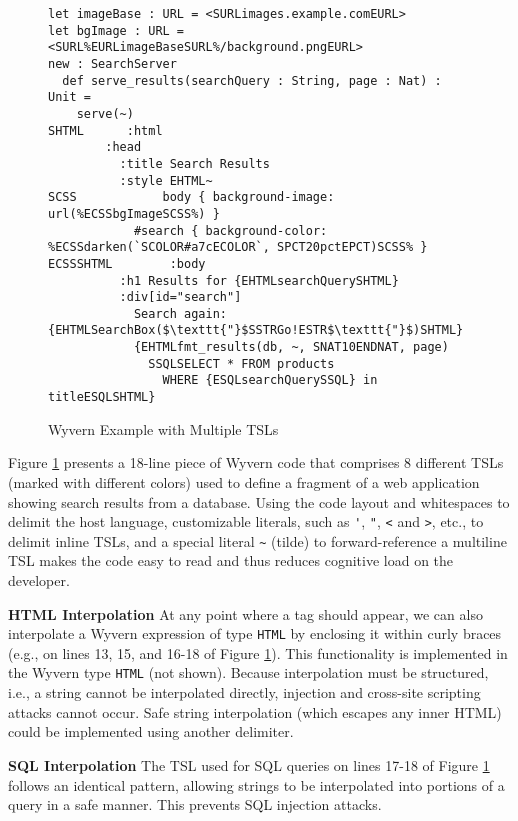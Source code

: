 \documentclass{sig-alternate}
\let\li\lstinline
\begin{document}
\begin{figure}[t]
\begin{lstlisting}
let imageBase : URL = <SURLimages.example.comEURL>
let bgImage : URL = <SURL%EURLimageBaseSURL%/background.pngEURL>
new : SearchServer
  def serve_results(searchQuery : String, page : Nat) : Unit =
    serve(~)
SHTML      :html
        :head
          :title Search Results
          :style EHTML~
SCSS            body { background-image: url(%ECSSbgImageSCSS%) }
            #search { background-color: %ECSSdarken(`SCOLOR#a7cECOLOR`, SPCT20pctEPCT)SCSS% }
ECSSSHTML        :body
          :h1 Results for {EHTMLsearchQuerySHTML}
          :div[id="search"]
            Search again: {EHTMLSearchBox($\texttt{"}$SSTRGo!ESTR$\texttt{"}$)SHTML}
            {EHTMLfmt_results(db, ~, SNAT10ENDNAT, page)
              SSQLSELECT * FROM products
                WHERE {ESQLsearchQuerySSQL} in titleESQLSHTML}
\end{lstlisting}
\vspace{-1px}
\caption{Wyvern Example with Multiple TSLs}
\label{f-example}
\vspace{-10px}
\end{figure}

Figure \ref{f-example} presents a 18-line piece of Wyvern code that comprises 8 different TSLs (marked with different colors) used to define a fragment of a web application showing search results from a database. Using the code layout and whitespaces to delimit the host language, customizable literals, such as \li{'}, \li{"}, \li{<} and \li{>}, etc., to delimit inline TSLs, and a special literal \li{~} (tilde) to forward-reference a multiline TSL makes the code easy to read and thus reduces cognitive load on the developer.

\textbf{HTML Interpolation} At any point where a tag should appear, we can also interpolate a Wyvern expression of type \li{HTML} by enclosing it within curly braces (e.g., on lines 13, 15, and 16-18 of Figure \ref{f-example}). This functionality is implemented in the Wyvern type \li{HTML} (not shown). Because interpolation must be structured, i.e., a string cannot be interpolated directly, injection and cross-site scripting attacks cannot occur. Safe string interpolation (which escapes any inner HTML) could be implemented using another delimiter.

\textbf{SQL Interpolation} The TSL used for SQL queries on lines 17-18 of Figure \ref{f-example} follows an identical pattern, allowing strings to be interpolated into portions of a query in a safe manner. This prevents SQL injection attacks.
\end{document}
